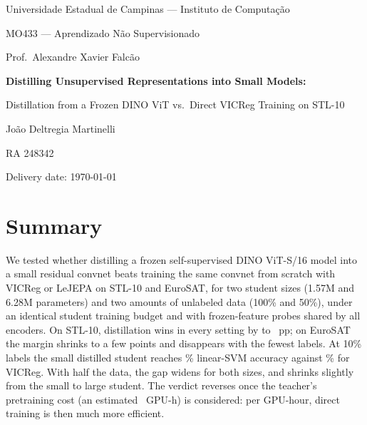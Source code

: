 \documentclass[letterpaper,11pt]{article}
\begin{document}
\begin{titlepage}
  \centering
  {\large Universidade Estadual de Campinas --- Instituto de Computa\c{c}\~ao\par}
  {\large MO433 --- Aprendizado N\~ao Supervisionado\par}
  {Prof.\ Alexandre Xavier Falc\~ao\par}
  \vspace{1.5cm}
  {\LARGE\bfseries Distilling Unsupervised Representations into Small Models:\par}
  \vspace{0.3cm}
  {\Large Distillation from a Frozen DINO ViT vs.\ Direct VICReg Training on STL-10\par}
  \vspace{1.2cm}
  {\large Jo\~ao Deltregia Martinelli\par}
  {RA 248342\par}
  \vspace{0.3cm}
  {Delivery date: \today\par}
  \vspace{1.2cm}
  \begin{minipage}{0.88\linewidth}
  \section*{Summary}
  \raggedright
We tested whether distilling a frozen self-supervised DINO ViT-S/16 model into a small residual
convnet beats training the same convnet from scratch with VICReg or LeJEPA on STL-10 and EuroSAT,
for two student sizes (1.57M and 6.28M parameters) and two amounts of unlabeled data (100\%
and 50\%), under an identical student training budget and with frozen-feature probes shared
by all encoders. On STL-10, distillation wins in every setting by \GapLFullRbfHundred{} to
\GapLHalfLinOne~pp; on EuroSAT the margin shrinks to a few points and disappears with the fewest labels. At 10\% labels the small
distilled student reaches \AccCSFullLinTen\% linear-SVM accuracy against \AccBSFullLinTen\%
for VICReg. With half the data, the gap widens for
both sizes, and shrinks slightly from the small to large student. The verdict reverses once the teacher's pretraining cost (an estimated \GpuHTeacherPretrain~GPU-h) is considered: per GPU-hour, direct training is then much more efficient.
  \end{minipage}
\end{titlepage}
\end{document}
